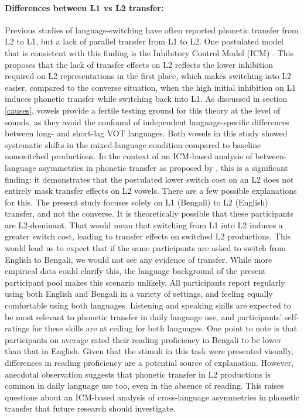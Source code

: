 \documentclass[12 pt]{article}
\begin{document}
\paragraph{Differences between L1 vs L2 transfer:}
Previous studies of language-switching have often reported phonetic transfer from L2 to L1, but a lack of parallel transfer from L1 to L2. One postulated model that is consistent with this finding is the Inhibitory Control Model (ICM) \cite{green1986control,olson2013bilingual,tsui2019impact}. This proposes that the lack of transfer effects on L2 reflects the lower inhibition required on L2 representations in the first place, which makes switching into L2 easier, compared to the converse situation, when the high initial inhibition on L1 induces phonetic transfer while switching back into L1.  As discussed in section \ref{causes}, vowels provide a fertile testing ground for this theory at the level of sounds, as they avoid the confound of independent language-specific differences between long- and short-lag VOT languages. Both vowels in this study showed systematic shifts in the mixed-language condition compared to baseline nonswitched productions. In the context of an ICM-based analysis of between-language asymmetries in phonetic transfer as proposed by \cite{olson2013bilingual}, this is a significant finding: it demonstrates that the postulated lower switch cost on an L2 does not entirely mask transfer effects on L2 vowels. There are a few possible explanations for this. The present study focuses solely on L1 (Bengali) to L2 (English) transfer, and not the converse. It is theoretically possible that these participants are L2-dominant. That would mean that switching from L1 into L2 induces a greater switch cost, leading to transfer effects on switched L2 productions. This would lead us to expect that if the same participants are asked to switch from English to Bengali, we would not see any evidence of transfer. While more empirical data could clarify this, the language background of the present participant pool makes this scenario unlikely. All participants report regularly using both English and Bengali in a variety of settings, and feeling equally comfortable using both languages. Listening and speaking skills are expected to be most relevant to phonetic transfer in daily language use, and participants' self-ratings for these skills are at ceiling for both languages. One point to note is that participants on average rated their reading proficiency in Bengali to be lower than that in English. Given that the stimuli in this task were presented visually, differences in reading proficiency are a potential source of explanation. However, anecdotal observation suggests that phonetic transfer in L2 productions is common in daily language use too, even in the absence of reading. This raises questions about an ICM-based analysis of cross-language asymmetries in phonetic transfer that future research should investigate.
\end{document}
